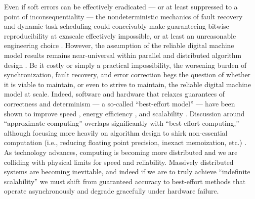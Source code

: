 Even if soft errors can be effectively eradicated --- or at least suppressed to a point of inconsequentiality --- the nondeterministic mechanics of fault recovery and dynamic task scheduling could conceivably make guaranteeing bitwise reproducibility at exascale effectively impossible, or at least an unreasonable engineering choice \citep{dongarra2014applied}.
However, the assumption of the reliable digital machine model results remains near-universal within parallel and distributed algorithm design \citep{chakradhar2010best}.
Be it costly or simply a practical impossibility, the worsening burden of synchronization, fault recovery, and error correction begs the question of whether it is viable to maintain, or even to strive to maintain, the reliable digital machine model at scale.
Indeed, software and hardware that relaxes guarantees of correctness and determinism --- a so-called ``best-effort model'' --- have been shown to improve speed \citep{chakrapani2008probabilistic}, energy efficiency \citep{chakrapani2008probabilistic,bocquet2018memory}, and scalability \citep{meng2009best}.
Discussion around ``approximate computing'' overlaps significantly with ``best-effort computing,'' although focusing more heavily on algorithm design to shirk non-essential computation (i.e., reducing floating point precision, inexact memoization, etc.) \citep{mittal2016survey}.
As technology advances, computing is becoming more distributed and we are colliding with physical limits for speed and reliability.
Massively distributed systems are becoming inevitable, and indeed if we are to truly achieve ``indefinite scalability'' \citep{ackley2011pursue} we must shift from guaranteed accuracy to best-effort methods that operate asynchronously and degrade gracefully under hardware failure.


